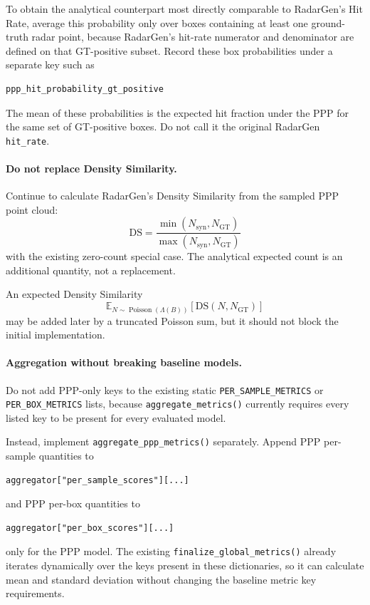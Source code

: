 \documentclass[11pt,a4paper]{article}
\begin{document}
To obtain the analytical counterpart most directly comparable to RadarGen's Hit Rate, average this probability only over boxes containing at least one ground-truth radar point, because RadarGen's hit-rate numerator and denominator are defined on that GT-positive subset. Record these box probabilities under a separate key such as
\begin{lstlisting}
ppp_hit_probability_gt_positive
\end{lstlisting}

The mean of these probabilities is the expected hit fraction under the PPP for the same set of GT-positive boxes. Do not call it the original RadarGen \texttt{hit\_rate}.

\paragraph{Do not replace Density Similarity.}
Continue to calculate RadarGen's Density Similarity from the sampled PPP point cloud:
\[
    \mathrm{DS}
    =
    \frac{\min(N_{\mathrm{syn}},N_{\mathrm{GT}})}
         {\max(N_{\mathrm{syn}},N_{\mathrm{GT}})}
\]
with the existing zero-count special case. The analytical expected count is an additional quantity, not a replacement.

An expected Density Similarity
\[
    \mathbb E_{N\sim\operatorname{Poisson}(\Lambda(B))}
    [\mathrm{DS}(N,N_{\mathrm{GT}})]
\]
may be added later by a truncated Poisson sum, but it should not block the initial implementation.

\paragraph{Aggregation without breaking baseline models.}
Do not add PPP-only keys to the existing static \texttt{PER\_SAMPLE\_METRICS} or \texttt{PER\_BOX\_METRICS} lists, because \texttt{aggregate\_metrics()} currently requires every listed key to be present for every evaluated model.

Instead, implement \texttt{aggregate\_ppp\_metrics()} separately. Append PPP per-sample quantities to
\begin{lstlisting}
aggregator["per_sample_scores"][...]
\end{lstlisting}
and PPP per-box quantities to
\begin{lstlisting}
aggregator["per_box_scores"][...]
\end{lstlisting}
only for the PPP model. The existing \texttt{finalize\_global\_metrics()} already iterates dynamically over the keys present in these dictionaries, so it can calculate mean and standard deviation without changing the baseline metric key requirements.
\end{document}
